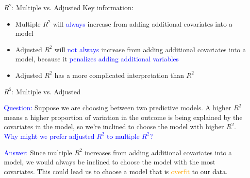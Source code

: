 \documentclass[10pt,t]{beamer}
\begin{document}
\begin{frame}{$R^2$: Multiple vs. Adjusted}
Key information:

\vspace{0.3cm}

\begin{itemize}
	\item Multiple $R^2$ will  \textcolor{blue}{always} increase from adding additional covariates into a model
	\bigskip
	
	
	\item Adjusted $R^2$ will \textcolor{blue}{not always} increase from adding additional covariates into a model, because it \textcolor{blue}{penalizes adding additional variables}
	\bigskip
	
	\item Adjusted $R^2$ has a more complicated interpretation than $R^2$ 
\end{itemize}

\end{frame}

\begin{frame}{$R^2$: Multiple vs. Adjusted}

\textcolor{blue}{Question:} Suppose we are choosing between two predictive models. A higher $R^2$ means a higher proportion of variation in the outcome is being explained by the covariates in the model, so we're inclined to choose the model with higher $R^2$. \textcolor{blue}{Why might we prefer adjusted $R^2$ to multiple $R^2$? }

\bigskip

\textcolor{blue}{Answer:} Since multiple $R^2$ increases from adding additional covariates into a model, we would always be inclined to choose the model with the most covariates. This could lead us to choose a model that is \textcolor{orange}{overfit} to our data.

\end{frame}
\end{document}
